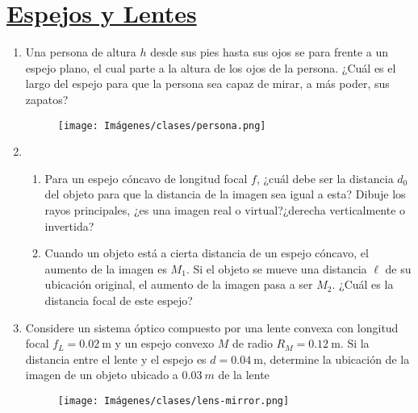 \documentclass[letterpaper,11pt]{article}
\begin{document}
\section*{\underline{Espejos y Lentes}}
\begin{enumerate}

\item Una persona de altura $h$ desde sus pies hasta sus ojos se para frente a un espejo plano, el cual parte a la altura de los ojos de la persona. ¿Cuál es el largo del espejo para que la persona sea capaz de mirar, a más poder, sus zapatos?

\begin{figure}[H]
    \centering
    \texttt{[image: Imágenes/clases/persona.png]}
\end{figure}

\item

\begin{enumerate}
    \item Para un espejo cóncavo de longitud focal $f$, ¿cuál debe ser la distancia $d_0$ del objeto para que la distancia de la imagen sea igual a esta? Dibuje los rayos principales, ¿es una imagen real o virtual?¿derecha verticalmente o invertida?

    \item Cuando un objeto está a cierta distancia de un espejo cóncavo, el aumento de la imagen es $M_1$. Si el objeto se mueve una distancia $\ell$ de su ubicación original, el aumento de la imagen pasa a ser $M_2$. ¿Cuál es la distancia focal de este espejo?
\end{enumerate}

\item Considere un sistema óptico compuesto por una lente convexa con longitud focal $f_L = \SI{0.02}{\m}$ y un espejo convexo $M$ de radio $R_M = \SI{0.12}{\m}$. Si la distancia entre el lente y el espejo es $d=\SI{0.04}{\m}$, determine la ubicación de la imagen de un objeto ubicado a $\SI{0.03}{m}$ de la lente

\begin{figure}[H]
    \centering
    \texttt{[image: Imágenes/clases/lens-mirror.png]}
\end{figure}



\end{enumerate}
\end{document}
